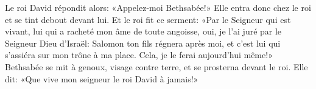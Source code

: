 Le roi David répondit alors: «Appelez-moi Bethsabée!»
	Elle entra donc chez le roi et se tint debout devant lui.
Et le roi fit ce serment:
	«Par le Seigneur qui est vivant, lui qui a racheté mon âme de toute angoisse,
	oui, je l’ai juré par le Seigneur Dieu d’Israël:
	Salomon ton fils régnera après moi,
	et c’est lui qui s’assiéra sur mon trône à ma place.
Cela, je le ferai aujourd’hui même!»
Bethsabée se mit à genoux, visage contre terre, et se prosterna devant le roi.
	Elle dit: «Que vive mon seigneur le roi David à jamais!»

